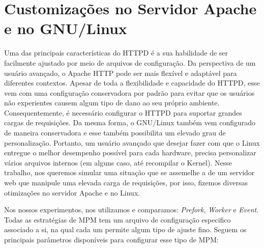 \section{Customizações no Servidor Apache e no GNU/Linux}
\label{sec:customization}

Uma das principais características do HTTPD é a sua habilidade de ser
facilmente ajustado por meio de arquivos de configuração. Da perspectiva de um
usuário avançado, o Apache HTTP pode ser mais flexível e adaptável para
diferentes contextos. Apesar de toda a flexibilidade e capacidade do HTTPD,
esse vem com uma configuração conservadora por padrão para evitar que os
usuários não experientes causem algum tipo de dano ao seu próprio ambiente.
Consequentemente, é necessário configurar o HTTPD para suportar grandes cargas
de requisições. Da mesma forma, o GNU/Linux também vem configurado de maneira
conservadora e esse também possibilita um elevado grau de personalização.
Portanto, um usuário avançado que desejar fazer com que o Linux entregue o
melhor desempenho possível para cada hardware, precisa personalizar vários
arquivos internos (em alguns caso, até recompilar o Kernel). Nesse trabalho,
nos queremos simular uma situação que se assemelhe a de um servidor web que
manipule uma elevada carga de requisições, por isso, fizemos diversas
otimizações no servidor Apache e no Linux.

Nos nossos experimentos, nos utilizamos e comparamos: \emph{Prefork},
\emph{Worker} e \emph{Event}. Todas as estratégias de MPM tem um arquivo de
configuração especifico associado a si, na qual cada um permite algum tipo de
ajuste fino. Seguem os principais parâmetros disponíveis para configurar esse
tipo de MPM:

